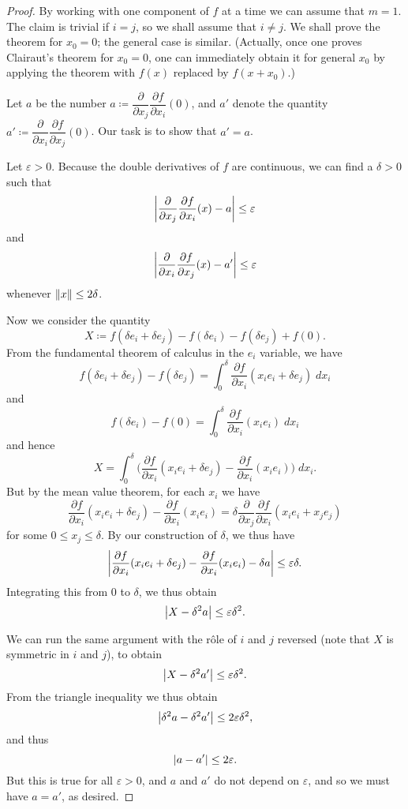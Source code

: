 \begin{proof}
  By working with one component of \(f\) at a time we can assume that \(m = 1\).
  The claim is trivial if \(i = j\), so we shall assume that \(i \neq j\).
  We shall prove the theorem for \(x_0 = 0\);
  the general case is similar.
  (Actually, once one proves Clairaut's theorem for \(x_0 = 0\), one can immediately obtain it for general \(x_0\) by applying the theorem with \(f(x)\) replaced by \(f(x + x_0)\).)

  Let \(a\) be the number \(a \coloneqq \dfrac{\partial}{\partial x_j} \dfrac{\partial f}{\partial x_i}(0)\), and \(a'\) denote the quantity \(a' \coloneqq \dfrac{\partial}{\partial x_i} \dfrac{\partial f}{\partial x_j}(0)\).
  Our task is to show that \(a' = a\).

  Let \(\varepsilon > 0\).
  Because the double derivatives of \(f\) are continuous, we can find a \(\delta > 0\) such that
  \[
    \abs{\dfrac{\partial}{\partial x_j} \dfrac{\partial f}{\partial x_i}(x) - a} \leq \varepsilon
  \]
  and
  \[
    \abs{\dfrac{\partial}{\partial x_i} \dfrac{\partial f}{\partial x_j}(x) - a'} \leq \varepsilon
  \]
  whenever \(\norm*{x} \leq 2\delta\).

  Now we consider the quantity
  \[
    X \coloneqq f(\delta e_i + \delta e_j) - f(\delta e_i) - f(\delta e_j) + f(0).
  \]
  From the fundamental theorem of calculus in the \(e_i\) variable, we have
  \[
    f(\delta e_i + \delta e_j) - f(\delta e_j) = \int_0^{\delta} \dfrac{\partial f}{\partial x_i}(x_i e_i + \delta e_j) \; d x_i
  \]
  and
  \[
    f(\delta e_i) - f(0) = \int_0^{\delta} \dfrac{\partial f}{\partial x_i}(x_i e_i) \; d x_i
  \]
  and hence
  \[
    X = \int_0^{\delta} \bigg(\dfrac{\partial f}{\partial x_i} (x_i e_i + \delta e_j) - \dfrac{\partial f}{\partial x_i} (x_i e_i)\bigg) \; d x_i.
  \]
  But by the mean value theorem, for each \(x_i\) we have
  \[
    \dfrac{\partial f}{\partial x_i} (x_i e_i + \delta e_j) - \dfrac{\partial f}{\partial x_i} (x_i e_i) = \delta \dfrac{\partial}{\partial x_j} \dfrac{\partial f}{\partial x_i} (x_i e_i + x_j e_j)
  \]
  for some \(0 \leq x_j \leq \delta\).
  By our construction of \(\delta\), we thus have
  \[
    \abs{\dfrac{\partial f}{\partial x_i} (x_i e_i + \delta e_j) - \dfrac{\partial f}{\partial x_i} (x_i e_i) - \delta a} \leq \varepsilon \delta.
  \]
  Integrating this from \(0\) to \(\delta\), we thus obtain
  \[
    \abs{X - \delta^2 a} \leq \varepsilon \delta^2.
  \]

  We can run the same argument with the rôle of \(i\) and \(j\) reversed (note that \(X\) is symmetric in \(i\) and \(j\)), to obtain
  \[
    \abs{X - \delta^2 a'} \leq \varepsilon \delta^2.
  \]
  From the triangle inequality we thus obtain
  \[
    \abs{\delta^2 a - \delta^2 a'} \leq 2 \varepsilon \delta^2,
  \]
  and thus
  \[
    \abs{a - a'} \leq 2 \varepsilon.
  \]
  But this is true for all \(\varepsilon > 0\), and \(a\) and \(a'\) do not depend on \(\varepsilon\), and so we must have \(a = a'\), as desired.
\end{proof}

